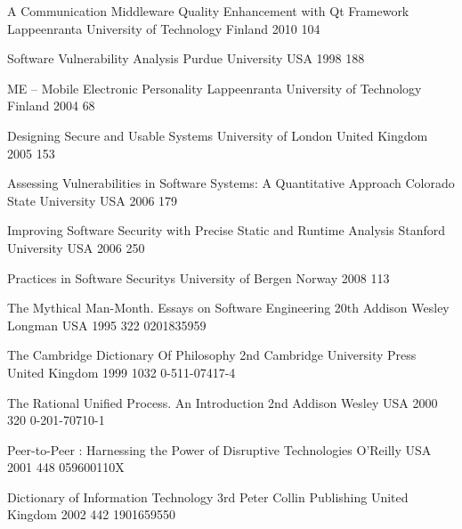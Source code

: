 \begin{thebibliography}{9}
		{}
		{A Communication Middleware Quality Enhancement with {Qt} Framework}
		{Lappeenranta University of Technology}
		{Finland}
		{2010}
		{104}


		{}
		{Software Vulnerability Analysis}
		{Purdue University}
		{USA}
		{1998}
		{188}

		{}
		{ME -- Mobile Electronic Personality}
		{Lappeenranta University of Technology}
		{Finland}
		{2004}
		{68}
		
		{}
		{Designing Secure and Usable Systems}
		{University of London}
		{United Kingdom}
		{2005}
		{153}
	
		{}
		{Assessing Vulnerabilities in Software Systems: A Quantitative Approach}
		{Colorado State University}
		{USA}
		{2006}
		{179}
		
		{}
		{Improving Software Security with Precise Static and Runtime Analysis}
		{Stanford University}
		{USA}
		{2006}
		{250}
	
		{}
		{Practices in Software Securitys}
		{University of Bergen}
		{Norway}
		{2008}
		{113}


		{}
		{The Mythical Man-Month. Essays on Software Engineering}
		{20th}
		{Addison Wesley Longman}
		{USA}
		{1995}
		{322}
		{0201835959}
	
		{}
		{The {C}ambridge {D}ictionary Of {P}hilosophy}
		{2nd}
		{Cambridge University Press}
		{United Kingdom}
		{1999}
		{1032}
		{0-511-07417-4}
	
		{}
		{The Rational Unified Process. An Introduction}
		{2nd}
		{Addison Wesley}
		{USA}
		{2000}
		{320}
		{0-201-70710-1}

		{}
		{Peer-to-Peer : Harnessing the Power of Disruptive Technologies}
		{}
		{O'Reilly}
		{USA}
		{2001}
		{448}
		{059600110X}
		
		{} %
		{Dictionary of {I}nformation {T}echnology}
		{3rd}
		{Peter Collin Publishing}
		{United Kingdom}
		{2002}
		{442}
		{1901659550}
		

\end{thebibliography}
